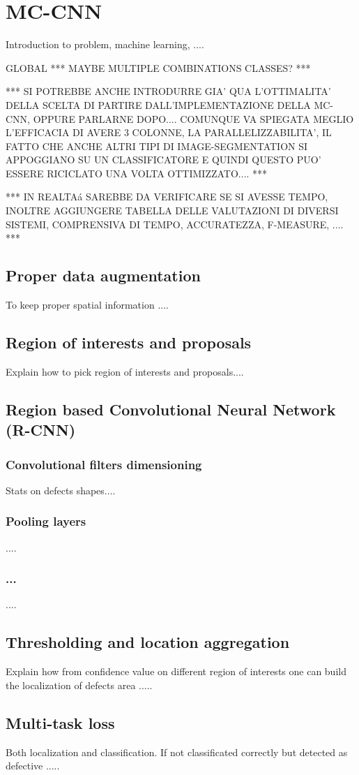 \section{MC-CNN}\label{section:mc-cnn}
    Introduction to problem, machine learning, ....

    GLOBAL *** MAYBE MULTIPLE COMBINATIONS CLASSES? *** 

    \par{
        *** SI POTREBBE ANCHE INTRODURRE GIA' QUA L'OTTIMALITA' DELLA SCELTA DI PARTIRE DALL'IMPLEMENTAZIONE DELLA MC-CNN, OPPURE PARLARNE DOPO.... COMUNQUE VA SPIEGATA MEGLIO L'EFFICACIA DI AVERE 3 COLONNE, LA PARALLELIZZABILITA', IL FATTO CHE ANCHE ALTRI TIPI DI IMAGE-SEGMENTATION SI APPOGGIANO SU UN CLASSIFICATORE E QUINDI QUESTO PUO' ESSERE RICICLATO UNA VOLTA OTTIMIZZATO.... ***
    }

    *** IN REALTAá SAREBBE DA VERIFICARE SE SI AVESSE TEMPO, INOLTRE AGGIUNGERE TABELLA DELLE VALUTAZIONI DI DIVERSI SISTEMI, COMPRENSIVA DI TEMPO, ACCURATEZZA, F-MEASURE, .... *** 

    \subsection{Proper data augmentation}
        To keep proper spatial information ....

    \subsection{Region of interests and proposals}
        Explain how to pick region of interests and proposals....

    \subsection{Region based Convolutional Neural Network (R-CNN)}
        \subsubsection{Convolutional filters dimensioning}
            Stats on defects shapes....
        \subsubsection{Pooling layers}
            ....
        \subsubsection{...}
            ....
    
    \subsection{Thresholding and location aggregation}
        Explain how from confidence value on different region of interests one can build the localization of defects area .....

    \subsection{Multi-task loss}
    Both localization and classification. If not classificated correctly but detected as defective .....
